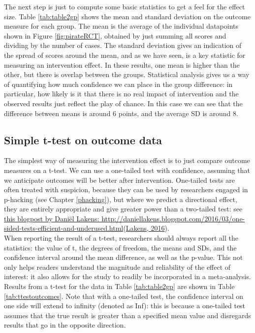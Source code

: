 \documentclass{krantz}
\begin{document}
The next step is just to compute some basic statistics to get a feel for the effect size. Table \ref{tab:table2gp} shows the mean and standard deviation on the outcome measure for each group. The mean is the average of the individual datapoints shown in Figure \ref{fig:pirateRCT}, obtained by just summing all scores and dividing by the number of cases. The standard deviation gives an indication of the spread of scores around the mean, and as we have seen, is a key statistic for measuring an intervention effect. In these results, one mean is higher than the other, but there is overlap between the groups. Statistical analysis gives us a way of quantifying how much confidence we can place in the group difference: in particular, how likely is it that there is no real impact of intervention and the observed results just reflect the play of chance. In this case we can see that the difference between means is around 6 points, and the average SD is around 8.

\hypertarget{simple-t-test-on-outcome-data}{%
\subsection{Simple t-test on outcome data}\label{simple-t-test-on-outcome-data}}

The simplest way of measuring the intervention effect is to just compare outcome measures on a t-test. We can use a one-tailed test with confidence, assuming that we anticipate outcomes will be better after intervention. One-tailed tests are often treated with suspicion, because they can be used by researchers engaged in p-hacking (see Chapter \ref{phacking}), but where we predict a directional effect, they are entirely appropriate and give greater power than a two-tailed test: see \href{http://daniellakens.blogspot.com/2016/03/one-sided-tests-efficient-and-underused.html}{this blogpost by Daniël Lakens: http://daniellakens.blogspot.com/2016/03/one-sided-tests-efficient-and-underused.html}(\protect\hyperlink{ref-lakens2016b}{Lakens, 2016}).\\
When reporting the result of a t-test, researchers should always report all the statistics: the value of t, the degrees of freedom, the means and SDs, and the confidence interval around the mean difference, as well as the p-value. This not only helps readers understand the magnitude and reliability of the effect of interest: it also allows for the study to readily be incorporated in a meta-analysis. Results from a t-test for the data in Table \ref{tab:table2gp} are shown in Table \ref{tab:ttestoutcomes}. Note that with a one-tailed test, the confidence interval on one side will extend to infinity (denoted as Inf): this is because a one-tailed test assumes that the true result is greater than a specified mean value and disregards results that go in the opposite direction. 
\end{document}

